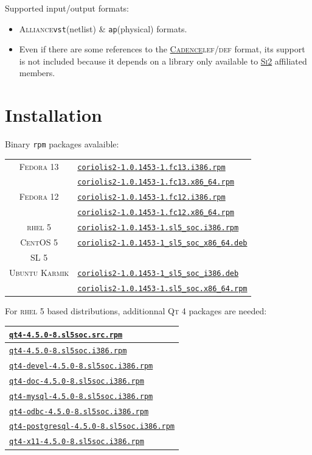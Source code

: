 \documentclass[11pt]{article}
\newcommand {\crlFtpUrl}    [1] {http://asim.lip6.fr/pub/coriolis/2.0/#1}
\newcommand {\slSocSrpmsUrl}[1] {http://ftp.lip6.fr/pub/linux/distributions/slsoc/5x/i386/SLSoC/SRPMS/#1}
\newcommand {\slRpmsUrl}    [1] {http://ftp.lip6.fr/pub/linux/distributions/slsoc/5x/i386/i386/SL/#1}
\newcommand{\xhref}        [2]{\href{#2}{#1}}
\newcommand{\crlFtpRef}    [1]{\href{\crlFtpUrl{#1}}{\texttt{\footnotesize #1}}}
\newcommand{\slSocSrpmsRef}[1]{\href{\slSocSrpmsUrl{#1}}{\texttt{\footnotesize #1}}}
\newcommand{\slRpmsRef}    [1]{\href{\slRpmsUrl{#1}}{\texttt{\footnotesize #1}}}
\newcommand{\xhref}        [2]{\htmladdnormallink{#1}{#2}}
\newcommand{\crlFtpRef}    [1]{\htmladdnormallink{#1}{\crlFtpUrl{#1}}}
\newcommand{\slSocSrpmsRef}[1]{\htmladdnormallink{#1}{\slSocSrpmsUrl{#1}}}
\newcommand{\slRpmsRef}    [1]{\htmladdnormallink{#1}{\slRpmsUrl{#1}}}
\newcommand {\SiII}               {\xhref{\textsc{Si2}}{http://www.si2.org/}\xspace}
\newcommand {\Cadence}            {\xhref{\textsc{Cadence}}{http://www.cadence.com/}\xspace}
\newcommand {\LEFDEF}             {\textsc{lef/def}\xspace}
\newcommand {\RHELV}              {\textsc{rhel 5}\xspace}
\newcommand {\CentOSV}            {\textsc{CentOS 5}\xspace}
\newcommand {\SLV}                {\textsc{SL 5}\xspace}
\newcommand {\FedoraXII}          {\textsc{Fedora 12}\xspace}
\newcommand {\FedoraXIII}         {\textsc{Fedora 13}\xspace}
\newcommand {\Karmik}             {\textsc{Ubuntu Karmik}\xspace}
\newcommand {\QtIV}               {\textsc{Qt 4}\xspace}
\newcommand {\rpm}                {\texttt{rpm}\xspace}
\newcommand {\Alliance}           {\textsc{Alliance}\xspace}
\newcommand {\vst}                {\texttt{vst}\xspace}
\newcommand {\ap}                 {\texttt{ap}\xspace}
\newcommand {\coriolisIIfcXIIIirpm}{\crlFtpRef{coriolis2-1.0.1453-1.fc13.i386.rpm}\xspace}
\newcommand {\coriolisIIfcXIIIxrpm}{\crlFtpRef{coriolis2-1.0.1453-1.fc13.x86\_64.rpm}\xspace}
\newcommand {\coriolisIIfcXIIirpm} {\crlFtpRef{coriolis2-1.0.1453-1.fc12.i386.rpm}\xspace}
\newcommand {\coriolisIIfcXIIxrpm} {\crlFtpRef{coriolis2-1.0.1453-1.fc12.x86\_64.rpm}\xspace}
\newcommand {\coriolisIIslVirpm}   {\crlFtpRef{coriolis2-1.0.1453-1.sl5\_soc.i386.rpm}\xspace}
\newcommand {\coriolisIIslVxrpm}   {\crlFtpRef{coriolis2-1.0.1453-1\_sl5\_soc\_x86\_64.deb}\xspace}
\newcommand {\coriolisIIkarmikideb}{\crlFtpRef{coriolis2-1.0.1453-1\_sl5\_soc\_i386.deb}\xspace}
\newcommand {\coriolisIIkarmikxdeb}{\crlFtpRef{coriolis2-1.0.1453-1.sl5\_soc.x86\_64.rpm}\xspace}
\newcommand {\qtIVsrpm}            {\slSocSrpmsRef{qt4-4.5.0-8.sl5soc.src.rpm}\xspace}
\newcommand {\qtIVirpm}            {\slRpmsRef{qt4-4.5.0-8.sl5soc.i386.rpm}\xspace}
\newcommand {\qtIVdevelirpm}       {\slRpmsRef{qt4-devel-4.5.0-8.sl5soc.i386.rpm}\xspace}
\newcommand {\qtIVdocirpm}         {\slRpmsRef{qt4-doc-4.5.0-8.sl5soc.i386.rpm}\xspace}
\newcommand {\qtIVmysqlirpm}       {\slRpmsRef{qt4-mysql-4.5.0-8.sl5soc.i386.rpm}\xspace}
\newcommand {\qtIVodbcirpm}        {\slRpmsRef{qt4-odbc-4.5.0-8.sl5soc.i386.rpm}\xspace}
\newcommand {\qtIVpostgresqlirpm}  {\slRpmsRef{qt4-postgresql-4.5.0-8.sl5soc.i386.rpm}\xspace}
\newcommand {\qtIVxXIirpm}         {\slRpmsRef{qt4-x11-4.5.0-8.sl5soc.i386.rpm}\xspace}
\begin{document}
 \noindent Supported input/output formats:
 \begin{itemize}
   \item \Alliance \vst (netlist) \& \ap (physical) formats.
   \item Even if there are some references to the \Cadence \LEFDEF format, its
         support is not included because it depends on a library only available
         to \SiII affiliated members.
 \end{itemize}


 \section{Installation}

 Binary \rpm packages avalaible:
 \begin{center}
 \begin{tabular}{|c|l|}
   \hline
   \FedoraXIII & \coriolisIIfcXIIIirpm  \\
               & \coriolisIIfcXIIIxrpm  \\
   \hline
   \FedoraXII  & \coriolisIIfcXIIirpm  \\
               & \coriolisIIfcXIIxrpm  \\
   \hline
   \RHELV      & \coriolisIIslVirpm  \\
   \CentOSV    & \coriolisIIslVxrpm  \\
   \SLV        &                     \\
   \hline
   \Karmik     & \coriolisIIkarmikideb  \\
               & \coriolisIIkarmikxdeb  \\
   \hline
 \end{tabular}
 \end{center}

 \newpage

 For \RHELV based distributions, additionnal \QtIV packages are needed:

 \begin{center}
 \begin{tabular}{|l|}
   \hline
   \qtIVsrpm           \\
   \hline
   \hline
   \qtIVirpm           \\
   \qtIVdevelirpm      \\
   \qtIVdocirpm        \\
   \qtIVmysqlirpm      \\
   \qtIVodbcirpm       \\
   \qtIVpostgresqlirpm \\
   \qtIVxXIirpm        \\
   \hline
 \end{tabular}
 \end{center}
\end{document}
